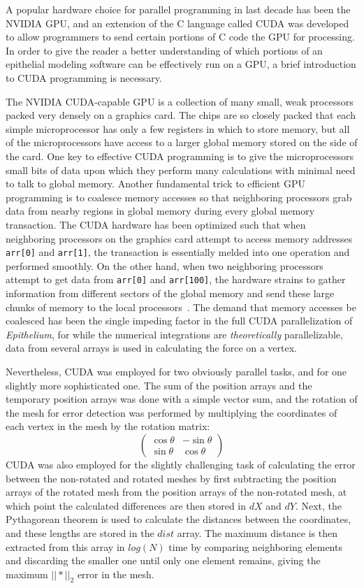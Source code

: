 A popular hardware choice for parallel programming in last decade has been the NVIDIA GPU, and an extension of the C language called CUDA was developed to allow programmers to send certain portions of C code the GPU for processing. In order to give the reader a better understanding of which portions of an epithelial modeling software can be effectively run on a GPU, a brief introduction to CUDA programming is necessary.

The NVIDIA CUDA-capable GPU is a collection of many small, weak processors packed very densely on a graphics card. The chips are so closely packed that each simple microprocessor has only a few registers in which to store memory, but all of the microprocessors have access to a larger global memory stored on the side of the card. One key to effective CUDA programming is to give the microprocessors small bits of data upon which they perform many calculations with minimal need to talk to global memory. Another fundamental trick to efficient GPU programming is to coalesce memory accesses so that neighboring processors grab data from nearby regions in global memory during every global memory transaction. The CUDA hardware has been optimized such that when neighboring processors on the graphics card attempt to access memory addresses \texttt{arr[0]} and \texttt{arr[1]}, the transaction is essentially melded into one operation and performed smoothly. On the other hand, when two neighboring processors attempt to get data from \texttt{arr[0]} and \texttt{arr[100]}, the hardware strains to gather information from different sectors of the global memory and send these large chunks of memory to the local processors~\cite{Udacity}. The demand that memory accesses be coalesced has been the single impeding factor in the full CUDA parallelization of \emph{Epithelium}, for while the numerical integrations are \emph{theoretically} parallelizable, data from several arrays is used in calculating the force on a vertex.

Nevertheless, CUDA was employed for two obviously parallel tasks, and for one slightly more sophisticated one. The sum of the position arrays and the temporary position arrays was done with a simple vector sum, and the rotation of the mesh for error detection was performed by multiplying the coordinates of each vertex in the mesh by the rotation matrix:
\[ \left( \begin{array}{cc}
\cos\theta & -\sin\theta \\
\sin\theta & \cos\theta 
\end{array} \right)\] 
CUDA was also employed for the slightly challenging task of calculating the error between the non-rotated and rotated meshes by first subtracting the position arrays of the rotated mesh from the position arrays of the non-rotated mesh, at which point the calculated differences are then stored in $dX$ and $dY$. Next, the Pythagorean theorem is used to calculate the distances between the coordinates, and these lengths are stored in the $dist$ array. The maximum distance is then extracted from this array in $log(N)$ time by comparing neighboring elements and discarding the smaller one until only one element remains, giving the maximum $||*||_2$ error in the mesh.

